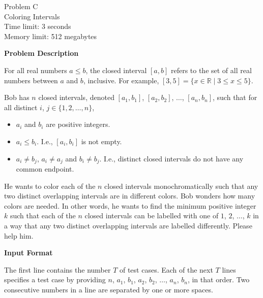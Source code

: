 \begin{center}
    {\LARGE Problem C}\vspace{1mm}\\
    {\Large Coloring Intervals}\\
    {Time limit: 3 seconds}\\
    {Memory limit: 512 megabytes}
\end{center}

\textbf{\large Problem Description}

For all real numbers $a\le b$, the closed interval $[a,b]$ refers to
the set of all real numbers between $a$ and $b$, inclusive.
For example, $[3,5]=\{x\in\mathbb{R}\mid 3\le x\le 5\}$.

Bob has
$n$
closed intervals, denoted $[a_1,b_1]$, $[a_2,b_2]$, $\ldots$,
$[a_n,b_n]$, such that
for all distinct $i$, $j\in\{1,2,\ldots,n\}$,
\begin{itemize}
\item $a_i$ and $b_i$ are positive integers.
\item $a_i\le b_i$. I.e., $[a_i,b_i]$ is not empty.
\item $a_i\neq b_j$, $a_i\neq a_j$ and $b_i\neq b_j$. I.e., distinct
closed intervals do not have any common endpoint.
\end{itemize}
He wants to color each of the $n$ closed intervals monochromatically
such that any two distinct overlapping intervals are in different
colors. Bob wonders how many colors are needed. In other words, 
he wants to find the minimum positive integer $k$ such that
each of
the $n$ closed intervals
can be
labelled with one of $1$, $2$, $\ldots$, $k$ in a way that any two
distinct overlapping
intervals are labelled differently.
Please help him.

\textbf{\large Input Format}

The first line contains the number $T$ of test cases.
Each of the next $T$ lines specifies a test case by providing
$n$, $a_1$, $b_1$, $a_2$, $b_2$, $\ldots$, $a_n$, $b_n$, in that order.
Two consecutive numbers in a line are separated by one or more spaces.

